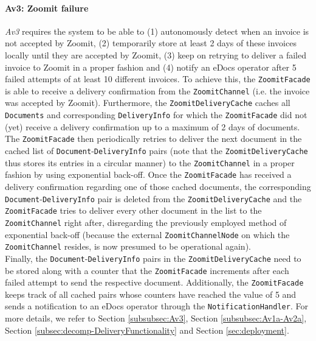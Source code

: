 \documentclass[a4paper,10pt]{article}
\begin{document}
\paragraph{Av3\@: Zoomit failure}
\textit{Av3} requires the system to be able to (1) autonomously detect when an invoice is not accepted by Zoomit, (2) temporarily store at least 2 days of these invoices locally until they are accepted by Zoomit, (3) keep on retrying to deliver a failed invoice to Zoomit in a proper fashion and (4) notify an eDocs operator after 5 failed attempts of at least 10 different invoices. To achieve this, the \texttt{ZoomitFacade} is able to receive a delivery confirmation from the \texttt{ZoomitChannel} (i.e. the invoice was accepted by Zoomit). Furthermore, the \texttt{ZoomitDeliveryCache} caches all \texttt{Documents} and corresponding \texttt{DeliveryInfo} for which the \texttt{ZoomitFacade} did not (yet) receive a delivery confirmation up to a maximum of 2 days of documents.\\
The \texttt{ZoomitFacade} then periodically retries to deliver the next document in the cached list of \texttt{Document}-\texttt{DeliveryInfo} pairs (note that the \texttt{ZoomitDeliveryCache} thus stores its entries in a circular manner) to the \texttt{ZoomitChannel} in a proper fashion by using exponential back-off. Once the \texttt{ZoomitFacade} has received a delivery confirmation regarding one of those cached documents, the corresponding \texttt{Document}-\texttt{DeliveryInfo} pair is deleted from the \texttt{ZoomitDeliveryCache} and the \texttt{ZoomitFacade} tries to deliver every other document in the list to the \texttt{ZoomitChannel} right after, disregarding the previously employed method of exponential back-off (because the external \texttt{ZoomitChannelNode} on which the \texttt{ZoomitChannel} resides, is now presumed to be operational again).\\
Finally, the \texttt{Document}-\texttt{DeliveryInfo} pairs in the \texttt{ZoomitDeliveryCache} need to be stored along with a counter that the \texttt{ZoomitFacade} increments after each failed attempt to send the respective document. Additionally, the \texttt{ZoomitFacade} keeps track of all cached pairs whose counters have reached the value of 5 and sends a notification to an eDocs operator through the \texttt{NotificationHandler}.
For more details, we refer to Section \ref{subsubsec:Av3}, Section \ref{subsubsec:Av1a-Av2a}, Section \ref{subsec:decomp-DeliveryFunctionality} and Section \ref{sec:deployment}.
\end{document}
